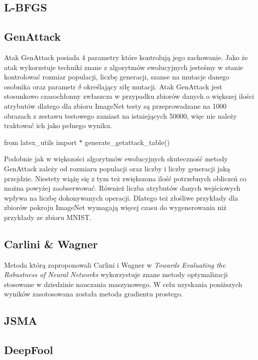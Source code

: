 \documentclass{article}
\begin{document}
\subsection{L-BFGS}



\subsection{GenAttack}
Atak GenAttack posiada 4 parametry które kontrolują jego zachowanie. Jako że atak wykorzstuje techniki
znane z algorytmów ewolucyjnych jesteśmy w stanie kontrolować rozmiar populacji, liczbę generacji, szanse na mutacje
danego osobnika oraz parametr \(\delta\) określający siłę mutacji. Atak GenAttack jest stosunkowo czasochłonny zwłaszcza
w przypadku zbiorów danych o większej ilości atrybutów dlatego dla zbioru ImageNet\cite{ILSVRC15} testy są przeprowadzane
na 1000 obrazach z zestawu testowego zamiast na istniejących 50000, więc nie należy traktować ich jako pełnego wyniku.

\begin{adjustbox}{max width=\textwidth}
\begin{pycode}
from latex_utils import *
generate_getattack_table()
\end{pycode}
\end{adjustbox}

Podobnie jak w większości algorytmów ewolucyjnych skuteczność metody GenAttack zależy od rozmiaru populacji oraz liczby
i liczby generacji jaką przejdzie. Niestety wiążę się z tym też zwiększona ilość potrzebnych obliczeń co można powyżej zaobserwować.
Również liczba atrybutów danych wejściowych wpływa na liczbę dokonywanych operacji. Dlatego też złośliwe przykłady dla zbiorów pokroju
ImageNet wymagają więcej czasu do wygenerowania niż przykłady ze zbioru MNIST.



    \subsection{Carlini \& Wagner}
    Metoda którą zaproponowali Carlini i Wagner w \textit{Towards Evaluating the Robustness of Neural Networks}\cite{DBLP:journals/corr/CarliniW16a}
    wykorzystuje znane metody optymalizacji stosowane w dziedzinie nauczania maszynowego. W celu uzyskania poniższych wyników zasotosowana została
    metoda gradientu prostego.
    \subsection{JSMA}
\subsection{DeepFool}





\end{document}
